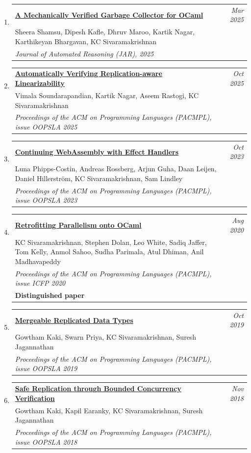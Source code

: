 \documentclass[10pt]{article}
\makeatletter
\newcommand{\lbar}[1]{{\color{#1}\ding{118}}\hspace*{2pt}}
\newenvironment{benumerate}[2]{
    \let\oldItem\item
    \def\item{\addtocounter{enumi}{-2}\oldItem}
    \begin{enumerate}[#2] \itemsep3pt
    \setcounter{enumi}{#1}
    \addtocounter{enumi}{1}}
  {\end{enumerate}}
\newenvironment{publication}[5]
{ \item
  \begin{tabular*}{7.5in}{p{6.3in}@{\extracolsep{\fill}}r}
    \href{#1}{\textbf{#2}} & \textit{#3}\\ #4 &\\ \textit{#5}&\\
  \end{tabular*}
} {}
\newenvironment{publicationNote}[6]
{ \item
  \begin{tabular*}{7.5in}{p{6.3in}@{\extracolsep{\fill}}r}
    \href{#1}{\textbf{#2}} & \textit{#3}\\ #4 &\\ \textit{#5}\\ \textbf{#6} \\
  \end{tabular*}
} {}
\newenvironment{region}[3]{%
  \Needspace{7\baselineskip}
  \vspace*{0.5ex}
  {\scalebox{1.4}{\textbf{#1}}}
  \begin{benumerate}{#3}{\color{RoyalBlue}#2}}
  {\end{benumerate}\vspace{0.8ex}}
\makeatother
\begin{document}
\begin{region} {\lbar{purple}Journal Publications}{{J}1}{10}

  \begin{publication}{https://kcsrk.info/papers/verifiedgc_feb_25.pdf}
    {A Mechanically Verified Garbage Collector for OCaml}
    {Mar 2025}{Sheera Shamsu, Dipesh Kafle, Dhruv Maroo, Kartik Nagar, Karthikeyan Bhargavan, KC Sivaramakrishnan}
		{Journal of Automated Reasoning (JAR), 2025}
	\end{publication}

  \begin{publication}{https://kcsrk.info/papers/mrdtconverge_jan_25.pdf}
    {Automatically Verifying Replication-aware Linearizability}
    {Oct 2025}{Vimala Soundarapandian, Kartik Nagar, Aseem Rastogi, KC Sivaramakrishnan}
		{Proceedings of the ACM on Programming Languages (PACMPL), issue OOPSLA 2025}
	\end{publication}

	\begin{publication}{https://kcsrk.info/papers/wasmfx_oopsla23.pdf}
    {Continuing WebAssembly with Effect Handlers}
    {Oct 2023}{Luna Phipps-Costin, Andreas Rossberg, Arjun Guha, Daan Leijen, Daniel Hillerström, KC Sivaramakrishnan, Sam Lindley}
		{Proceedings of the ACM on Programming Languages (PACMPL), issue OOPSLA 2023}
	\end{publication}

	\begin{publicationNote}{https://kcsrk.info/papers/retro-parallel_icfp_20.pdf}
		{Retrofitting Parallelism onto OCaml}
		{Aug 2020}{KC Sivaramakrishnan, Stephen Dolan, Leo White, Sadiq Jaffer, Tom Kelly, Anmol Sahoo, Sudha Parimala, Atul Dhiman, Anil Madhavapeddy}
		{Proceedings of the ACM on Programming Languages (PACMPL), issue ICFP 2020}
		{Distinguished paper}
	\end{publicationNote}

	\begin{publication}{http://kcsrk.info/papers/oopsla19-mrdt.pdf}
		{Mergeable Replicated Data Types}
    {Oct 2019}{Gowtham Kaki, Swarn Priya, KC Sivaramakrishnan, Suresh Jagannathan}
		{Proceedings of the ACM on Programming Languages (PACMPL), issue OOPSLA 2019}
  \end{publication}

	\begin{publication}{http://kcsrk.info/papers/oopsla18-q9.pdf}
		{Safe Replication through Bounded Concurrency Verification}
    {Nov 2018}{Gowtham Kaki, Kapil Earanky, KC Sivaramakrishnan, Suresh Jagannathan}
		{Proceedings of the ACM on Programming Languages (PACMPL), issue OOPSLA 2018}
  \end{publication}


\end{region}
\end{document}
